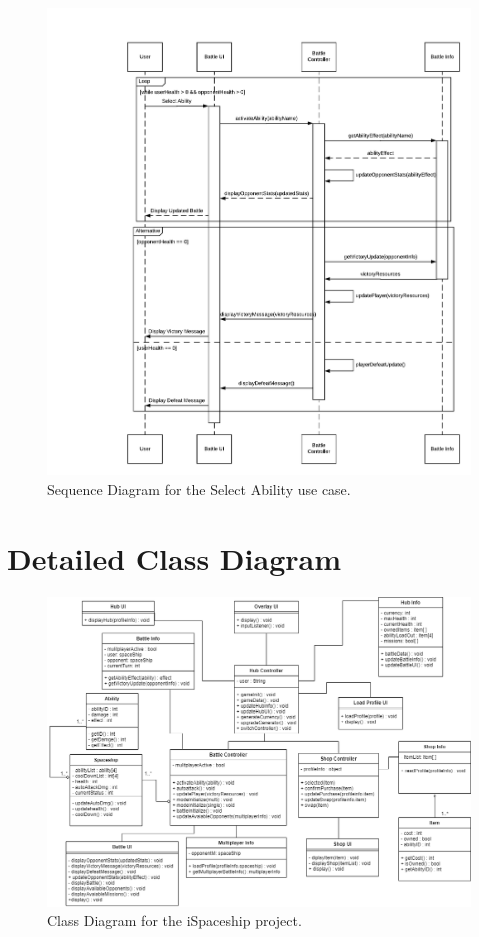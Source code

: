 \documentclass[]{article}
\begin{document}
\begin{figure}[H]
    \centering
    \includegraphics[width=\textwidth]{SD/SelectAbility.png}
    \caption{Sequence Diagram for the Select Ability use case.}
    \label{fig:sd}
\end{figure}



\section{Detailed Class Diagram}
\label{sec:detailed_class_diagram}
\begin{figure}[H]
    \centering
    \includegraphics[width=\textwidth]{ClassDiagram.png}
    \caption{Class Diagram for the iSpaceship project.}
    \label{fig:ca}
\end{figure}
\end{document}
